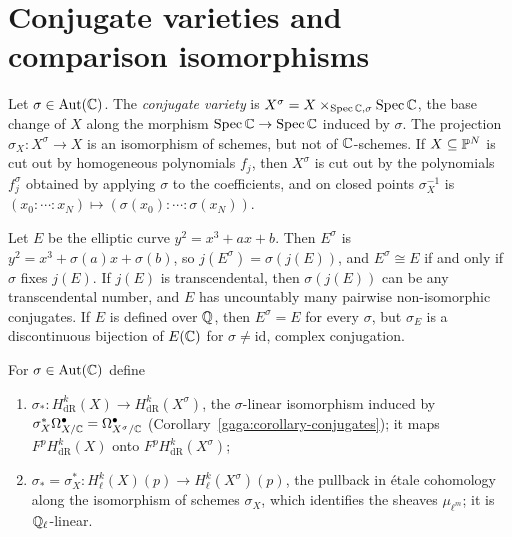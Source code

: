 \section{Conjugate varieties and comparison isomorphisms}\label{absolute-hodge:section-conjugates}

\begin{definition}\label{absolute-hodge:definition-conjugate}
Let $\sigma \in \mathrm{Aut}(\mathbb{C})$. The \emph{conjugate variety} is $X^\sigma = X \times_{\operatorname{Spec}\mathbb{C},\sigma}\operatorname{Spec}\mathbb{C}$, the base change of $X$ along the morphism $\operatorname{Spec}\mathbb{C} \to \operatorname{Spec}\mathbb{C}$ induced by $\sigma$. The
projection $\sigma_X \colon X^\sigma \to X$ is an isomorphism of schemes, but not of $\mathbb{C}$-schemes. If $X \subseteq \mathbb{P}^N$ is cut out by homogeneous polynomials $f_j$, then $X^\sigma$ is cut out by the
polynomials $f_j^\sigma$ obtained by applying $\sigma$ to the coefficients, and on closed points $\sigma_X^{-1}$ is $(x_0 : \cdots : x_N) \mapsto (\sigma(x_0) : \cdots : \sigma(x_N))$.
\end{definition}

\begin{example}\label{absolute-hodge:example-elliptic}
Let $E$ be the elliptic curve $y^2 = x^3 + ax + b$. Then $E^\sigma$ is $y^2 = x^3 + \sigma(a)x + \sigma(b)$, so $j(E^\sigma) = \sigma(j(E))$, and $E^\sigma \cong E$ if and only if $\sigma$ fixes $j(E)$. If
$j(E)$ is transcendental, then $\sigma(j(E))$ can be any transcendental number, and $E$ has uncountably many pairwise non-isomorphic conjugates. If $E$ is defined over $\mathbb{Q}$, then $E^\sigma = E$ for
every $\sigma$, but $\sigma_E$ is a discontinuous bijection of $E(\mathbb{C})$ for $\sigma \neq \mathrm{id}$, complex conjugation.
\end{example}

\begin{definition}\label{absolute-hodge:definition-transport}
For $\sigma \in \mathrm{Aut}(\mathbb{C})$ define
\begin{enumerate}
\item $\sigma_* \colon H^k_{\mathrm{dR}}(X) \to H^k_{\mathrm{dR}}(X^\sigma)$, the $\sigma$-linear isomorphism induced by $\sigma_X^*\Omega^\bullet_{X/\mathbb{C}} = \Omega^\bullet_{X^\sigma/\mathbb{C}}$
(Corollary~\ref{gaga:corollary-conjugates}); it maps $F^pH^k_{\mathrm{dR}}(X)$ onto $F^pH^k_{\mathrm{dR}}(X^\sigma)$;
\item $\sigma_* = \sigma_X^* \colon H^k_\ell(X)(p) \to H^k_\ell(X^\sigma)(p)$, the pullback in \'etale cohomology along the isomorphism of schemes $\sigma_X$, which identifies the sheaves $\mu_{\ell^m}$; it is
$\mathbb{Q}_\ell$-linear.
\end{enumerate}
\end{definition}

